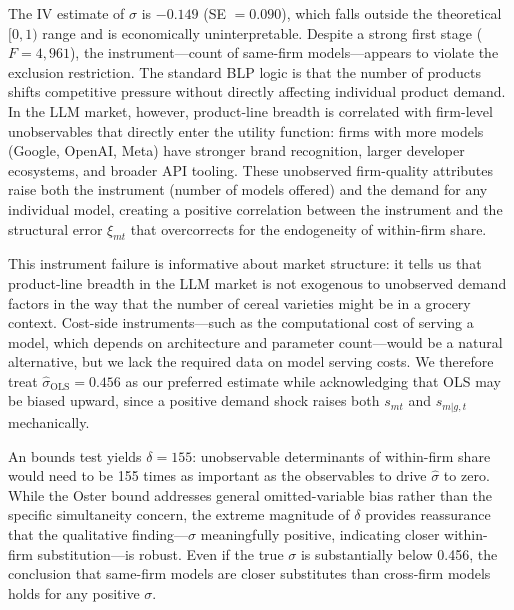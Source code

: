 \documentclass[11pt, a4paper]{article}
\begin{document}
The IV estimate of $\sigma$ is $-0.149$ (SE $= 0.090$), which falls outside the theoretical $[0, 1)$ range and is economically uninterpretable. Despite a strong first stage ($F = 4{,}961$), the instrument---count of same-firm models---appears to violate the exclusion restriction. The standard BLP logic is that the number of products shifts competitive pressure without directly affecting individual product demand. In the LLM market, however, product-line breadth is correlated with firm-level unobservables that directly enter the utility function: firms with more models (Google, OpenAI, Meta) have stronger brand recognition, larger developer ecosystems, and broader API tooling. These unobserved firm-quality attributes raise both the instrument (number of models offered) and the demand for any individual model, creating a positive correlation between the instrument and the structural error $\xi_{mt}$ that overcorrects for the endogeneity of within-firm share.

This instrument failure is informative about market structure: it tells us that product-line breadth in the LLM market is not exogenous to unobserved demand factors in the way that the number of cereal varieties might be in a grocery context. Cost-side instruments---such as the computational cost of serving a model, which depends on architecture and parameter count---would be a natural alternative, but we lack the required data on model serving costs. We therefore treat $\hat{\sigma}_{\text{OLS}} = 0.456$ as our preferred estimate while acknowledging that OLS may be biased upward, since a positive demand shock raises both $s_{mt}$ and $s_{m|g,t}$ mechanically.

An \citet{oster2019unobservable} bounds test yields $\delta = 155$: unobservable determinants of within-firm share would need to be 155 times as important as the observables to drive $\hat{\sigma}$ to zero. While the Oster bound addresses general omitted-variable bias rather than the specific simultaneity concern, the extreme magnitude of $\delta$ provides reassurance that the qualitative finding---$\sigma$ meaningfully positive, indicating closer within-firm substitution---is robust. Even if the true $\sigma$ is substantially below 0.456, the conclusion that same-firm models are closer substitutes than cross-firm models holds for any positive $\sigma$.
\end{document}

